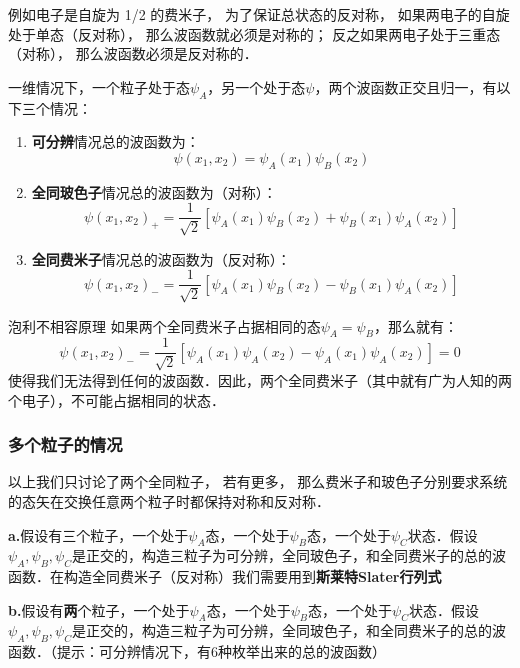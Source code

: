例如电子是自旋为 1/2 的费米子， 为了保证总状态的反对称， 如果两电子的自旋处于单态（反对称）， 那么波函数就必须是对称的； 反之如果两电子处于三重态（对称）， 那么波函数必须是反对称的．
\begin{example}{}\label{IdPar_ex2}
一维情况下，一个粒子处于态$\psi_A$，另一个处于态$\psi$，两个波函数正交且归一，有以下三个情况：
\begin{enumerate}
\item \textbf{可分辨}情况总的波函数为：
\begin{equation}
\psi(x_1,x_2)=\psi_A(x_1)\psi_B(x_2)
\end{equation}
\item \textbf{全同玻色子}情况总的波函数为（对称）：
\begin{equation}
\psi(x_1,x_2)_+=\frac{1}{\sqrt{2}}[\psi_A(x_1)\psi_B(x_2)+\psi_B(x_1)\psi_A(x_2)]
\end{equation}
\item \textbf{全同费米子}情况总的波函数为（反对称）：
\begin{equation}
\psi(x_1,x_2)_-=\frac{1}{\sqrt{2}}[\psi_A(x_1)\psi_B(x_2)-\psi_B(x_1)\psi_A(x_2)]
\end{equation}
\end{enumerate}
\end{example}
\begin{corollary}{泡利不相容原理}
如果两个全同费米子占据相同的态$\psi_A=\psi_B$，那么就有：
\begin{equation}
\psi(x_1,x_2)_-=\frac{1}{\sqrt{2}}[\psi_A(x_1)\psi_A(x_2)-\psi_A(x_1)\psi_A(x_2)]=0
\end{equation}
使得我们无法得到任何的波函数．因此，两个全同费米子（其中就有广为人知的两个电子），不可能占据相同的状态．
\end{corollary}

\subsubsection{多个粒子的情况}
以上我们只讨论了两个全同粒子， 若有更多， 那么费米子和玻色子分别要求系统的态矢在交换任意两个粒子时都保持对称和反对称．
\begin{exercise}{}
\textbf{a.}假设有三个粒子，一个处于$\psi_A$态，一个处于$\psi_B$态，一个处于$\psi_C$状态．假设$\psi_A,\psi_B,\psi_C$是正交的，构造三粒子为可分辨，全同玻色子，和全同费米子的总的波函数．在构造全同费米子（反对称）我们需要用到\textbf{斯莱特Slater行列式}

\textbf{b.}假设有\textbf{两}个粒子，一个处于$\psi_A$态，一个处于$\psi_B$态，一个处于$\psi_C$状态．假设$\psi_A,\psi_B,\psi_C$是正交的，构造三粒子为可分辨，全同玻色子，和全同费米子的总的波函数．（提示：可分辨情况下，有$6$种枚举出来的总的波函数）
\end{exercise}
